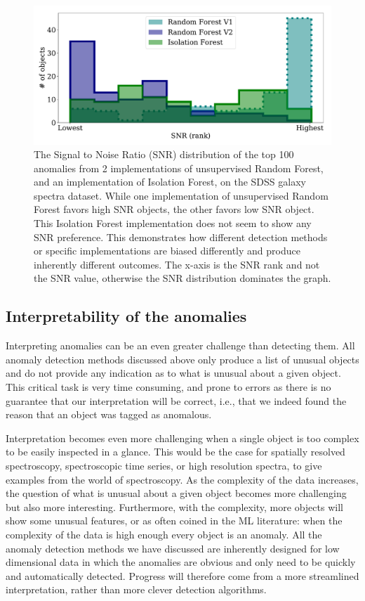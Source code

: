 \documentclass[fleqn,usenatbib]{mnras}
\begin{document}
{\begin{figure}
  \begin{center}
  \includegraphics[width=\columnwidth]{snrdist.pdf}
  \caption{The Signal to Noise Ratio (SNR) distribution of the top 100 anomalies from 2 implementations of unsupervised Random Forest, and an implementation of Isolation Forest, on the SDSS galaxy spectra dataset. While one implementation of unsupervised Random Forest favors high SNR objects, the other favors low SNR object. This Isolation Forest implementation does not seem to show any SNR preference. This demonstrates how different detection methods or specific implementations are biased differently and produce inherently different outcomes. The x-axis is the SNR rank and not the SNR value, otherwise the SNR distribution dominates the graph.}\label{fig:anomalies_snr}
  \end{center}
\end{figure}





\subsection{Interpretability of the anomalies}

Interpreting  anomalies can be an even greater challenge than detecting them. All anomaly detection methods discussed above only produce a list of unusual objects and do not provide any indication as to what is unusual about a given object. This critical task is very time consuming, and prone to errors as there is  no guarantee that our interpretation will be correct, i.e., that we indeed found the reason that an object was tagged as anomalous. 

Interpretation becomes even more challenging when a single object is too complex to be easily inspected in a glance. This would be the case for spatially resolved spectroscopy, spectroscopic time series, or high resolution spectra, to give examples from the world of spectroscopy. As the complexity of the data increases, the question of what is unusual about a given object becomes more challenging but also more interesting. Furthermore, with the complexity,  more objects will show some unusual features, or as often coined in the ML literature: when the complexity of the data is high enough every object is an anomaly. All the anomaly detection methods we have discussed are inherently designed for low dimensional data in which the anomalies are obvious and only need to be quickly and automatically detected. Progress will therefore come from a more streamlined interpretation, rather than more clever detection algorithms. 

}
\end{document}
